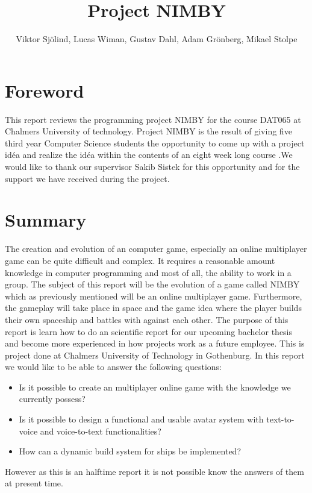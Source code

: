 \documentclass[11pt]{report}
\title{\textbf{Project NIMBY}}
\author{Viktor Sjölind, Lucas Wiman, Gustav Dahl, 
Adam Grönberg, Mikael Stolpe}
\begin{document}
\maketitle
\section{Foreword}

This report reviews the programming project NIMBY for the course DAT065 at Chalmers University of technology. Project NIMBY is the result of giving five third year Computer Science students the opportunity to come up with a project idéa and realize the idéa within the contents of an eight week long course .We would like to thank our supervisor Sakib Sistek for this opportunity and for the support we have received during the project.

\section{Summary}
The creation and evolution of an computer game, especially an online multiplayer game can be quite difficult and complex. It requires a reasonable amount knowledge in computer programming and most of all, the ability to work in a group. The subject of this report will be the evolution of a game called NIMBY which as previously mentioned will be an online multiplayer game. Furthermore, the gameplay will take place in space and the game idea where the player builds their own spaceship and battles with against each other. The purpose of this report is learn how to do an scientific report for our upcoming bachelor thesis and become more experienced in how projects work as a future employee. This is project done at Chalmers University of Technology in Gothenburg. 
In this report we would like to be able to answer the following questions:
\begin{itemize}
\item{Is it possible to create an multiplayer online game with the knowledge we currently possess?} 
\item{Is it possible to design a functional and usable avatar system with text-to-voice and voice-to-text functionalities?}
\item{How can a dynamic build system for ships be implemented?}
\end{itemize}However as this is an halftime report it is not possible know the answers of them at present time.
\end{document}
